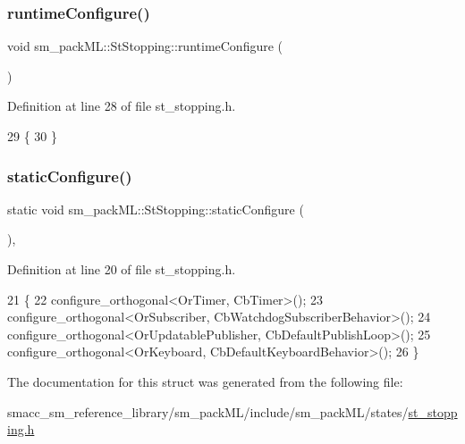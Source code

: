 \subsubsection{\texorpdfstring{runtime\+Configure()}{runtimeConfigure()}}
{\footnotesize\ttfamily void sm\+\_\+pack\+M\+L\+::\+St\+Stopping\+::runtime\+Configure (\begin{DoxyParamCaption}{ }\end{DoxyParamCaption})\hspace{0.3cm}{\ttfamily [inline]}}



Definition at line 28 of file st\+\_\+stopping.\+h.


\begin{DoxyCode}
29     \{
30     \}
\end{DoxyCode}
\mbox{\label{structsm__packML_1_1StStopping_a58aa3dd672aeb0496ce2047da298c611}} 
\subsubsection{\texorpdfstring{static\+Configure()}{staticConfigure()}}
{\footnotesize\ttfamily static void sm\+\_\+pack\+M\+L\+::\+St\+Stopping\+::static\+Configure (\begin{DoxyParamCaption}{ }\end{DoxyParamCaption})\hspace{0.3cm}{\ttfamily [inline]}, {\ttfamily [static]}}



Definition at line 20 of file st\+\_\+stopping.\+h.


\begin{DoxyCode}
21     \{
22         configure\_orthogonal<OrTimer, CbTimer>();   
23         configure\_orthogonal<OrSubscriber, CbWatchdogSubscriberBehavior>();
24         configure\_orthogonal<OrUpdatablePublisher, CbDefaultPublishLoop>();
25         configure\_orthogonal<OrKeyboard, CbDefaultKeyboardBehavior>();
26     \}
\end{DoxyCode}


The documentation for this struct was generated from the following file\+:\begin{DoxyCompactItemize}
\item 
smacc\+\_\+sm\+\_\+reference\+\_\+library/sm\+\_\+pack\+M\+L/include/sm\+\_\+pack\+M\+L/states/\hyperlink{st__stopping_8h}{st\+\_\+stopping.\+h}\end{DoxyCompactItemize}
